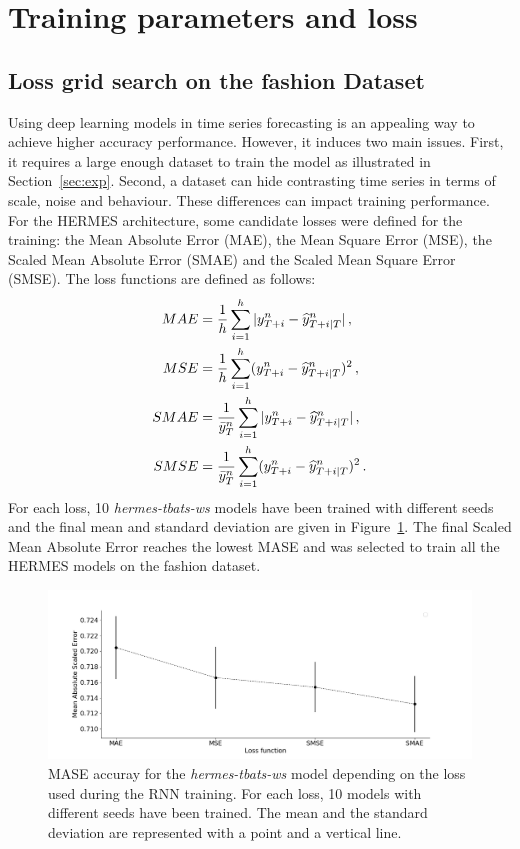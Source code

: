 \documentclass[10pt]{article} %
\newcommand{\ts}{y}
\newcommand{\tspred}{\widehat{\ts}}
\newcommand{\lag}{h}
\newcommand{\meants}{\Bar{\ts}}
\begin{document}
\section{Training parameters and loss}

\subsection{Loss grid search on the fashion Dataset}
\label{sec:fashiongridsearch}

Using deep learning models in time series forecasting is an appealing way to achieve higher accuracy performance. However, it induces two main issues. First, it requires a large enough dataset to train the model as illustrated in Section~\ref{sec:exp}. Second, a dataset can hide contrasting time series in terms of scale, noise and behaviour. These differences can impact training performance. For the HERMES architecture, some candidate losses were defined for the training: the Mean Absolute Error (MAE), the Mean Square Error (MSE),  the Scaled Mean Absolute Error (SMAE) and the Scaled Mean Square Error (SMSE). The loss functions are defined as follows:
\begin{align*}
MAE &= \frac{1}{\lag}\sum_{i=1}^{\lag}|\ts^n_{T+i} - \tspred^n_{T+i|T}|\,,\\
MSE &= \frac{1}{\lag}\sum_{i=1}^{\lag}(\ts^n_{T+i} - \tspred^n_{T+i|T})^2\,,\\
SMAE &= \frac{1}{\meants^n_T}\sum_{i=1}^{\lag}|\ts^n_{T+i} - \tspred^n_{T+i|T}|\,,\\
SMSE &= \frac{1}{\meants^n_T}\sum_{i=1}^{\lag}(\ts^n_{T+i} - \tspred^n_{T+i|T})^2\,.
\end{align*}
For each loss, 10 \textit{hermes-tbats-ws} models have been trained with different seeds and the final mean and standard deviation are given in Figure~\ref{fig:loss_function}. The final Scaled Mean Absolute Error reaches the lowest MASE and was selected to train all the HERMES models on the fashion dataset.

\begin{figure}
  \centering
    \includegraphics[width=1.\linewidth]{loss_function}
  \caption{MASE accuray for the \textit{hermes-tbats-ws} model depending on the loss used during the RNN training. For each loss, 10 models with different seeds have been trained. The mean and the standard deviation are represented with a point and a vertical line.}
\label{fig:loss_function}
\end{figure}
\end{document}
